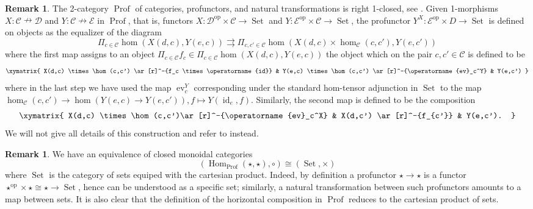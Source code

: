 \documentclass{article}
\newcommand{\Prof}{\operatorname{Prof}}%
\newcommand{\opp}{\operatorname{op}}%
\newcommand{\id}{\operatorname{id}}%
\newcommand{\ev}{\operatorname{ev}}%
\newcommand{\Set}{\operatorname{Set}}%
\newcommand{\Hom}{\operatorname{Hom}}%
\newcommand{\C}{\mathcal{C}}
\newcommand{\D}{\mathcal{D}}
\newcommand{\E}{\mathcal{E}}
\numberwithin{equation}{section}
\theoremstyle{definition}
\newtheorem{remark}[definition]{Remark}
\theoremstyle{theorem}
\begin{document}
\begin{remark}\label{Remark: The 2-category of Profunctors is closed}
    The 2-category $\Prof$ of categories, profunctors, and natural transformations is right 1-closed, see \cite[Proposition 4.3]{Benabou1973LesDistributeurs}. 
    Given 1-morphisms $X \colon \C \nrightarrow \D$ and $Y \colon \C \nrightarrow \E$ in $\Prof$, that is, functors 
    $X \colon \D^{\opp} \times \C \to \Set$ and $Y \colon \E^{\opp} \times \C \to \Set$, the profunctor $Y^X \colon \E^{\opp} \times D \to \Set$ 
    is defined on objects as the equalizer of the diagram 
    \begin{equation}
        \Pi_{c \in \C} \hom(X(d,c),Y(e,c)) \rightrightarrows \Pi_{c,c' \in \C} \hom(X(d,c) \times \hom_{\C}(c,c'), Y(e,c'))
    \end{equation}
    where the first map assigns to an object $\Pi_{c \in \C} f_c \in \Pi_{c \in \C} \hom(X(d,c),Y(e,c))$ the object which on the pair $c,c' \in \C$ is defined to be 
    \begin{equation}
        \xymatrix{
            X(d,c) \times \hom(c,c') \ar[r]^-{f_c \times \id} & Y(e,c) \times \hom(c,c') \ar[r]^-{\ev_c^Y} & Y(e,c')
        }
    \end{equation}
    where in the last step we have used the map $\ev_c^Y$ corresponding under the standard hom-tensor adjunction in $\Set$ to the map 
    $\hom_{\C}(c,c') \to \hom(Y(e,c) \to Y(e,c')), f \mapsto Y(\id_e,f)$. Similarly, the second map is defined to be the composition 
    \begin{equation}
        \xymatrix{
            X(d,c) \times \hom(c,c')\ar[r]^-{\ev_c^X} & X(d,c') \ar[r]^-{f_{c'}} & Y(e,c').
        }
    \end{equation}
    We will not give all details of this construction and refer to \cite{Benabou1973LesDistributeurs} instead.
\end{remark}
\begin{remark}\label{Remark: Prof is a categorification of Set}
    We have an equivalence of closed monoidal categories
    \begin{equation}
        (\Hom_{\Prof}(\star,\star),\circ) \cong (\Set,\times)
    \end{equation}
    where $\Set$ is the category of sets equiped with the cartesian product. Indeed, by definition a profunctor 
    $\star \to \star$ is a functor $\star^{\opp} \times \star \cong \star \to \Set$, hence can be understood as a specific set; 
    similarly, a natural transformation between such profunctors amounts to a map between sets. It is also clear that the definition 
    of the horizontal composition in $\Prof$ reduces to the cartesian product of sets. 
\end{remark}
\end{document}
